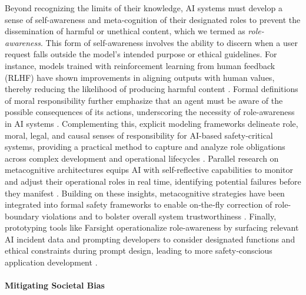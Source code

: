 Beyond recognizing the limits of their knowledge, AI systems must develop a sense of self-awareness and meta-cognition of their designated roles to prevent the dissemination of harmful or unethical content, which we termed as \emph{role-awareness}. This form of self-awareness involves the ability to discern when a user request falls outside the model's intended purpose or ethical guidelines.
For instance, models trained with reinforcement learning from human feedback (RLHF) have shown improvements in aligning outputs with human values, thereby reducing the likelihood of producing harmful content \citep{ouyang2022training}.
Formal definitions of moral responsibility further emphasize that an agent must be aware of the possible consequences of its actions, underscoring the necessity of role-awareness in AI systems \citep{beckers2023moral}.
Complementing this, explicit modeling frameworks delineate role, moral, legal, and causal senses of responsibility for AI-based safety‑critical systems, providing a practical method to capture and analyze role obligations across complex development and operational lifecycles \citep{ryan2023s}.
Parallel research on metacognitive architectures equips AI with self-reflective capabilities to monitor and adjust their operational roles in real time, identifying potential failures before they manifest \citep{johnson2022metacognition}.
Building on these insights, metacognitive strategies have been integrated into formal safety frameworks to enable on‑the‑fly correction of role-boundary violations and to bolster overall system trustworthiness \citep{walker2025harnessing}.
Finally, prototyping tools like Farsight operationalize role-awareness by surfacing relevant AI incident data and prompting developers to consider designated functions and ethical constraints during prompt design, leading to more safety‑conscious application development \citep{wang2024farsight}.





\paragraph{Mitigating Societal Bias}


